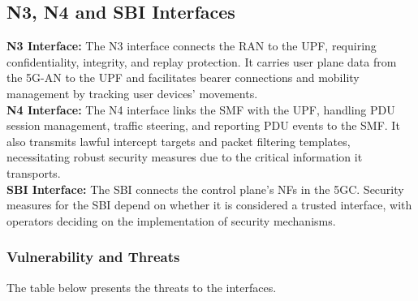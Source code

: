 \documentclass{report}
\begin{document}
\subsection{N3, N4 and SBI Interfaces}
\noindent\textbf{N3 Interface:} The N3 interface connects the RAN to the UPF, requiring confidentiality, integrity, and replay protection. It carries user plane data from the 5G-AN to the UPF and facilitates bearer connections and mobility management by tracking user devices' movements\cite{mahyoub2024security}.\\

\noindent\textbf{N4 Interface:} The N4 interface links the SMF with the UPF, handling PDU session management, traffic steering, and reporting PDU events to the SMF. It also transmits lawful intercept targets and packet filtering templates, necessitating robust security measures due to the critical information it transports.\\

\noindent\textbf{SBI Interface:} The SBI connects the control plane's NFs in the 5GC. Security measures for the SBI depend on whether it is considered a trusted interface, with operators deciding on the implementation of security mechanisms.

\subsubsection{Vulnerability and Threats}
The table below presents the threats to the interfaces.
\end{document}
